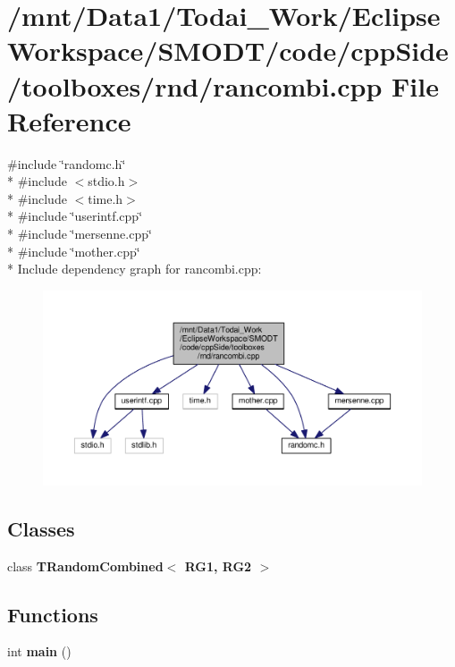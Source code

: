 \section{/mnt/\-Data1/\-Todai\-\_\-\-Work/\-Eclipse\-Workspace/\-S\-M\-O\-D\-T/code/cpp\-Side/toolboxes/rnd/rancombi.cpp File Reference}
\label{toolboxes_2rnd_2rancombi_8cpp}
{\ttfamily \#include \char`\"{}randomc.\-h\char`\"{}}\\*
{\ttfamily \#include $<$stdio.\-h$>$}\\*
{\ttfamily \#include $<$time.\-h$>$}\\*
{\ttfamily \#include \char`\"{}userintf.\-cpp\char`\"{}}\\*
{\ttfamily \#include \char`\"{}mersenne.\-cpp\char`\"{}}\\*
{\ttfamily \#include \char`\"{}mother.\-cpp\char`\"{}}\\*
Include dependency graph for rancombi.\-cpp\-:
\nopagebreak
\begin{figure}[H]
\begin{center}
\leavevmode
\includegraphics[width=350pt]{toolboxes_2rnd_2rancombi_8cpp__incl}
\end{center}
\end{figure}
\subsection*{Classes}
\begin{DoxyCompactItemize}
\item 
class {\bf T\-Random\-Combined$<$ R\-G1, R\-G2 $>$}
\end{DoxyCompactItemize}
\subsection*{Functions}
\begin{DoxyCompactItemize}
\item 
int {\bf main} ()
\end{DoxyCompactItemize}


